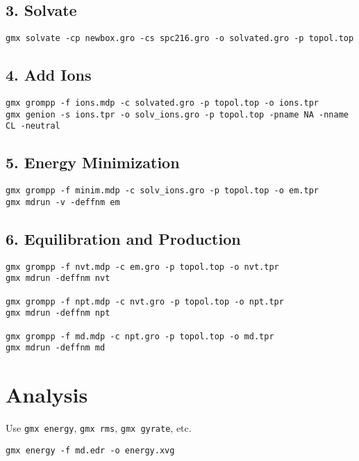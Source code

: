 \subsection*{3. Solvate}

\begin{verbatim}
gmx solvate -cp newbox.gro -cs spc216.gro -o solvated.gro -p topol.top
\end{verbatim}

\subsection*{4. Add Ions}

\begin{verbatim}
gmx grompp -f ions.mdp -c solvated.gro -p topol.top -o ions.tpr
gmx genion -s ions.tpr -o solv_ions.gro -p topol.top -pname NA -nname CL -neutral
\end{verbatim}

\subsection*{5. Energy Minimization}

\begin{verbatim}
gmx grompp -f minim.mdp -c solv_ions.gro -p topol.top -o em.tpr
gmx mdrun -v -deffnm em
\end{verbatim}

\subsection*{6. Equilibration and Production}

\begin{verbatim}
gmx grompp -f nvt.mdp -c em.gro -p topol.top -o nvt.tpr
gmx mdrun -deffnm nvt

gmx grompp -f npt.mdp -c nvt.gro -p topol.top -o npt.tpr
gmx mdrun -deffnm npt

gmx grompp -f md.mdp -c npt.gro -p topol.top -o md.tpr
gmx mdrun -deffnm md
\end{verbatim}

\section{Analysis}

Use \texttt{gmx energy}, \texttt{gmx rms}, \texttt{gmx gyrate}, etc.

\begin{verbatim}
gmx energy -f md.edr -o energy.xvg
\end{verbatim}

